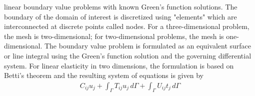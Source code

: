 \documentclass[11pt]{article}
\begin{document}
linear boundary value problems with known Green's function solutions. The boundary of the
domain of interest is discretized using "elements" which are interconnected at discrete points called
nodes. For a three-dimensional problem, the mesh is two-dimensional; for two-dimensional
problems, the mesh is one-dimensional. The boundary value problem is formulated as an equivalent
surface or line integral using the Green's function solution and the governing differential system.
For linear elasticity in two dimensions, the formulation is based on Betti's theorem and the resulting
system of equations is given by
\begin{align*}
    C_{ij}u_j + \int_{\varGamma} T_{ij}u_j  \,d\varGamma + \int_{\varGamma} U_{ij}t_j  \,d\varGamma \tag{13} \label{13}
\end{align*}
\end{document}
